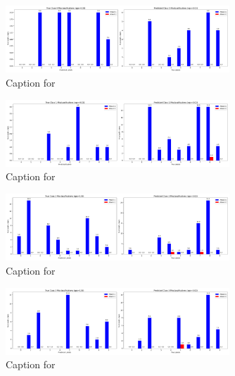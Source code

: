 \documentclass{article}
\begin{document}
\begin{figure}[!htbp]
\centering
\includegraphics[width=0.75\textwidth]{combined_class_boundary_pgd/combined_class_0_misclassifications_eps_0.03.png}
\caption{Caption for }
\label{fig:combined_class_0_misclassifications_eps_0.03.png}
\end{figure}

\begin{figure}[!htbp]
\centering
\includegraphics[width=0.75\textwidth]{combined_class_boundary_pgd/combined_class_1_misclassifications_eps_0.03.png}
\caption{Caption for }
\label{fig:combined_class_1_misclassifications_eps_0.03.png}
\end{figure}

\begin{figure}[!htbp]
\centering
\includegraphics[width=0.75\textwidth]{combined_class_boundary_pgd/combined_class_2_misclassifications_eps_0.03.png}
\caption{Caption for }
\label{fig:combined_class_2_misclassifications_eps_0.03.png}
\end{figure}

\begin{figure}[!htbp]
\centering
\includegraphics[width=0.75\textwidth]{combined_class_boundary_pgd/combined_class_3_misclassifications_eps_0.03.png}
\caption{Caption for }
\label{fig:combined_class_3_misclassifications_eps_0.03.png}
\end{figure}
\end{document}
